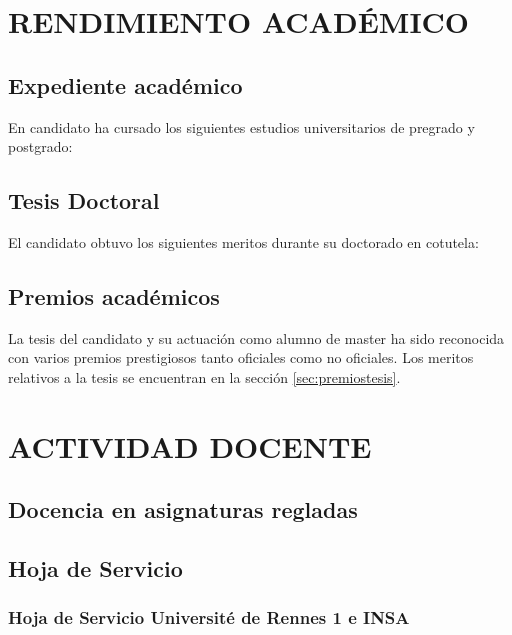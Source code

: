 
\section{RENDIMIENTO ACADÉMICO}

\subsection{Expediente académico}
En candidato ha cursado los siguientes estudios universitarios de pregrado y postgrado:\\

\startitems
{}    
\stopitems 


\subsection{Tesis Doctoral} 
El candidato obtuvo los siguientes meritos durante su doctorado en cotutela:\\
 
\startitems
{}
\stopitems


\subsection{Premios académicos} 	
La tesis del candidato y su actuación como alumno de master ha sido reconocida con varios premios prestigiosos tanto oficiales como no oficiales. Los meritos relativos a la tesis se encuentran en la sección \ref{sec:premiostesis}. \\ 

\startitems 
{}
\stopitems

\section{ACTIVIDAD DOCENTE}	

\subsection{Docencia en asignaturas regladas}
\startitems 
\printTeaching
\stopitems

\subsection{Hoja de Servicio}

\subsubsection{Hoja de Servicio Université de Rennes 1 e INSA}

